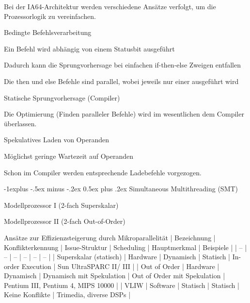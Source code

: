 \documentclass[10pt,landscape]{article}
\makeatletter
\renewcommand{\subsection}{\@startsection{subsection}{2}{0mm}%
                                {-1explus -.5ex minus -.2ex}%
                                {0.5ex plus .2ex}%
                                {\normalfont\normalsize\bfseries}}
\makeatother
\begin{document}
\begin{multicols}{3}
  Bei der IA64-Architektur werden verschiedene Ansätze verfolgt, um die Prozessorlogik zu vereinfachen.
  \begin{enumerate*}
    \item Bedingte Befehlsverarbeitung
    \begin{itemize*}
      \item Ein Befehl wird abhängig von einem Statusbit ausgeführt
      \item Dadurch kann die Sprungvorhersage bei einfachen if-then-else Zweigen entfallen
      \item Die then und else Befehle sind parallel, wobei jeweils nur einer ausgeführt wird
    \end{itemize*}
    \item Statische Sprungvorhersage (Compiler)
    \item Die Optimierung (Finden paralleler Befehle) wird im wesentlichen dem Compiler überlassen.
    \item Spekulatives Laden von Operanden
    \begin{itemize*}
      \item Möglichst geringe Wartezeit auf Operanden
      \item Schon im Compiler werden entsprechende Ladebefehle vorgezogen.
    \end{itemize*}
  \end{enumerate*}
  
  
  \subsection{ Simultaneous Multithreading (SMT)}
  
  \begin{itemize*}
    \item Modellprozessor I (2-fach Superskalar)
    \item Modellprozessor II (2-fach Out-of-Order)
  \end{itemize*}
  
  Ansätze zur Effizienzsteigerung durch Mikroparallelität
  | Bezeichnung | Konflikterkennung | Issue-Struktur | Scheduling | Hauptmerkmal | Beispiele |
  | -- | -- | -- | -- | -- | -- |
  | Superskalar (statisch) | Hardware | Dynamisch | Statisch | In-order Execution | Sun UltraSPARC II/ III |
  | Out of Order | Hardware | Dynamisch | Dynamisch mit Spekulation | Out of Order mit Spekulation | Pentium III, Pentium 4, MIPS 10000 | 
  | VLIW | Software | Statisch | Statisch | Keine Konflikte | Trimedia, diverse DSPs |
  

\end{multicols}
\end{document}
